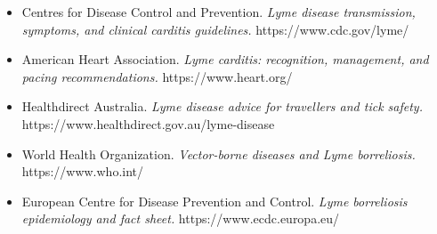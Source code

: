 \begin{itemize}
    \item Centres for Disease Control and Prevention. \textit{Lyme disease transmission, symptoms, and clinical carditis guidelines.} https://www.cdc.gov/lyme/
    \item American Heart Association. \textit{Lyme carditis: recognition, management, and pacing recommendations.} https://www.heart.org/
    \item Healthdirect Australia. \textit{Lyme disease advice for travellers and tick safety.} https://www.healthdirect.gov.au/lyme-disease
    \item World Health Organization. \textit{Vector-borne diseases and Lyme borreliosis.} https://www.who.int/
    \item European Centre for Disease Prevention and Control. \textit{Lyme borreliosis epidemiology and fact sheet.} https://www.ecdc.europa.eu/
\end{itemize}
